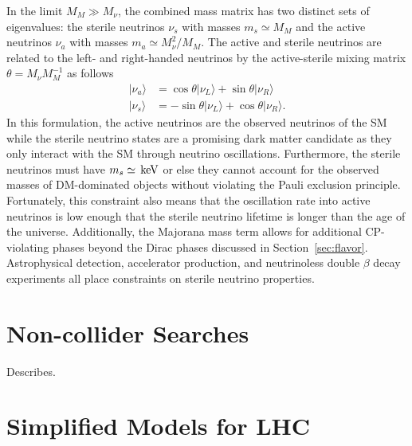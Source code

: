 In the limit $M_M \gg M_\nu$, %
the combined mass matrix has two distinct sets of eigenvalues: the sterile neutrinos $\nu_s$ with masses $m_s \simeq M_M$ and the active neutrinos $\nu_a$ with masses $m_a \simeq M_\nu^2 / M_M$.
The active and sterile neutrinos are related to the left- and right-handed neutrinos by the active-sterile mixing matrix $\theta = M_\nu M_M^{-1}$ as follows
\begin{align}
  | \nu_a \rangle & = \cos \theta | \nu_L \rangle + \sin \theta |\nu_R \rangle \nonumber \\
  | \nu_s \rangle & = - \sin \theta | \nu_L \rangle + \cos \theta |\nu_R \rangle.
\end{align}
In this formulation, the active neutrinos are the observed neutrinos of the SM while the sterile neutrino states are a promising dark matter candidate as they only interact with the SM through neutrino oscillations.
Furthermore, the sterile neutrinos must have $m_s \simeq \,\text{ke\hspace{-.08em}V}$ or else they cannot account for the observed masses of DM-dominated objects without violating the Pauli exclusion principle. %
Fortunately, this constraint also means that the oscillation rate into active neutrinos is low enough that the sterile neutrino lifetime is longer than the age of the universe.
Additionally, the Majorana mass term allows for additional CP-violating phases beyond the Dirac phases discussed in Section~\ref{sec:flavor}.
Astrophysical detection, accelerator production, and neutrinoless double $\beta$ decay experiments all place constraints on sterile neutrino properties. %

\section{Non-collider Searches}
\label{sec:dm_search}

Describes.

\section{Simplified Models for LHC}
\label{sec:dm_simp}

